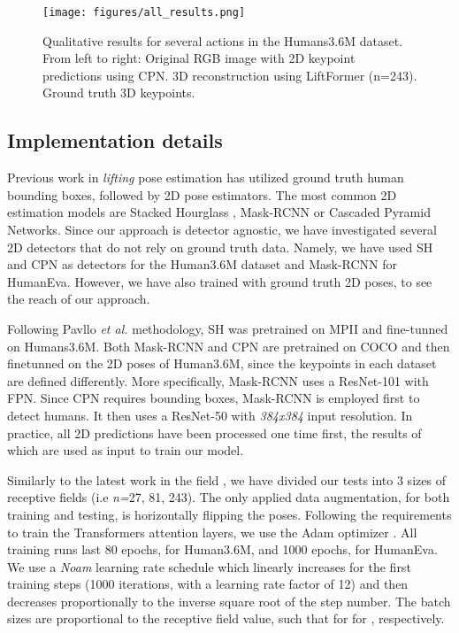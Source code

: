\documentclass[letterpaper]{article}
\begin{document}
\begin{figure*}[bp]
    \centering
    \texttt{[image: figures/all\_results.png]}
    \caption{Qualitative results for several actions in the Humans3.6M dataset. From left to right: Original RGB image with 2D keypoint predictions using CPN. 3D reconstruction using LiftFormer (n=243). Ground truth 3D keypoints.}
    \label{fig:qualitative_results}
\end{figure*}

\subsection{Implementation details}
Previous work in \textit{lifting} pose estimation has utilized ground truth human bounding boxes, followed by 2D pose estimators. The most common 2D estimation models are Stacked Hourglass \cite{newell16}, Mask-RCNN \cite{he17} or Cascaded Pyramid Networks\cite{chen18}. Since our approach is detector agnostic, we have investigated several 2D detectors that do not rely on ground truth data. Namely, we have used SH and CPN as detectors for the Human3.6M dataset and Mask-RCNN for HumanEva. However, we have also trained with ground truth 2D poses, to see the reach of our approach.

Following Pavllo \textit{et al.} \cite{pavllo19} methodology, SH  was pretrained on MPII and fine-tunned on Humans3.6M. Both Mask-RCNN and CPN are pretrained on COCO \cite{lin14} and then finetunned on the 2D poses of Human3.6M, since the keypoints in each dataset are defined differently. More specifically, Mask-RCNN uses a ResNet-101 with FPN. Since CPN requires bounding boxes, Mask-RCNN is employed first to detect humans. It then uses a ResNet-50 with \textit{384x384} input resolution. In practice, all 2D predictions have been processed one time first, the results of which are used as input to train our model.

Similarly to the latest work in the field \cite{pavllo19, liu20}, we have divided our tests into 3 sizes of receptive fields (i.e \textit{n=}27, 81, 243).  The only applied data augmentation, for both training and testing, is horizontally flipping the poses. Following the requirements to train the Transformers attention layers, we use the Adam optimizer \cite{reddi18}. All training runs last 80 epochs, for Human3.6M, and 1000 epochs, for HumanEva. We use a \textit{Noam} learning rate schedule which linearly increases for the first training steps \cite{goyal17} (1000 iterations, with a learning rate factor of 12) and then decreases proportionally to the inverse square root of the step number. The batch sizes are proportional to the receptive field value, such that for  for , respectively. 
\end{document}
